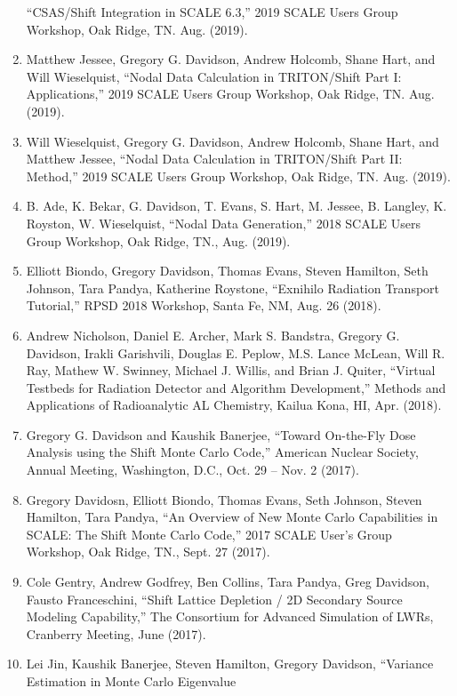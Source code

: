 \documentclass[letterpaper,11pt]{article}
\begin{document}
\begin{enumerate}
    ``CSAS/Shift Integration in SCALE 6.3,'' 2019 SCALE Users Group
    Workshop, Oak Ridge, TN. Aug. (2019).
  \item Matthew Jessee, Gregory G. Davidson, Andrew Holcomb, Shane
    Hart, and Will Wieselquist, ``Nodal Data Calculation in
    TRITON/Shift Part I: Applications,'' 2019 SCALE Users Group
    Workshop, Oak Ridge, TN. Aug. (2019).
  \item Will Wieselquist, Gregory G. Davidson, Andrew Holcomb, Shane
    Hart, and Matthew Jessee, ``Nodal Data Calculation in
    TRITON/Shift Part II: Method,'' 2019 SCALE Users Group Workshop,
    Oak Ridge, TN. Aug. (2019).
  \item B. Ade, K. Bekar, G. Davidson, T. Evans, S. Hart, M. Jessee,
    B. Langley, K. Royston, W. Wieselquist, ``Nodal Data
    Generation,'' 2018 SCALE Users Group Workshop, Oak Ridge, TN.,
    Aug. (2019).
  \item Elliott Biondo, Gregory Davidson, Thomas Evans, Steven
    Hamilton, Seth Johnson, Tara Pandya, Katherine Roystone,
    ``Exnihilo Radiation Transport Tutorial,'' RPSD 2018 Workshop,
    Santa Fe, NM, Aug. 26 (2018).
  \item Andrew Nicholson, Daniel E. Archer, Mark S. Bandstra,
    Gregory G. Davidson, Irakli Garishvili, Douglas E. Peplow,
    M.S. Lance McLean, Will R. Ray, Mathew W. Swinney, Michael
    J. Willis, and Brian J. Quiter, ``Virtual Testbeds for Radiation
    Detector and Algorithm Development,'' Methods and Applications
    of Radioanalytic AL Chemistry, Kailua Kona, HI, Apr. (2018).
  \item Gregory G. Davidson and Kaushik Banerjee, ``Toward
    On-the-Fly Dose Analysis using the Shift Monte Carlo Code,''
    American Nuclear Society, Annual Meeting, Washington, D.C.,
    Oct. 29 -- Nov. 2 (2017).
  \item Gregory Davidosn, Elliott Biondo, Thomas Evans, Seth
    Johnson, Steven Hamilton, Tara Pandya, ``An Overview of New
    Monte Carlo Capabilities in SCALE: The Shift Monte Carlo Code,''
    2017 SCALE User's Group Workshop, Oak Ridge, TN., Sept. 27 (2017).
  \item Cole Gentry, Andrew Godfrey, Ben Collins, Tara Pandya, Greg
    Davidson, Fausto Franceschini, ``Shift Lattice Depletion / 2D
    Secondary Source Modeling Capability,'' The Consortium for
    Advanced Simulation of LWRs, Cranberry Meeting, June (2017).
  \item Lei Jin, Kaushik Banerjee, Steven Hamilton, Gregory
    Davidson, ``Variance Estimation in Monte Carlo Eigenvalue

\end{enumerate}
\end{document}
